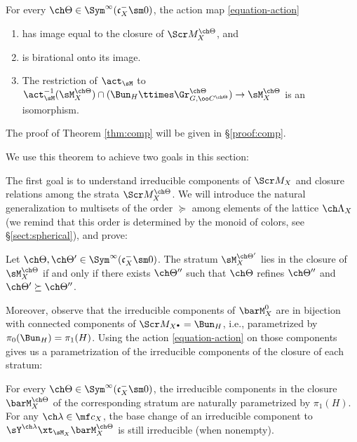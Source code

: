 \begin{thm}
\notready
\label{thm:comp}
For every $\ch\Theta \in \Sym^\infty(\mathfrak c_X^- \sm 0)$, the action map \eqref{equation-action}
\begin{enumerate}
\item has image equal to the closure of $\Scr M^{\ch\Theta}_X$, and
\item is birational onto its image.
\item The restriction of $\act_\sM$ to $\act_\sM^{-1}(\sM^{\ch\Theta}_X) \cap
(\Bun_H \ttimes \Gr^{\ch\Theta}_{G, \oo C^{\ch\Theta}}) \to \sM^{\ch\Theta}_X$
is an isomorphism.
\end{enumerate}
\end{thm}

The proof of Theorem \ref{thm:comp} will be given in \S \ref{proof:comp}.

We use this theorem to achieve two goals in this section:


The first goal is to understand irreducible components of $\Scr M_X$ and closure relations among the strata $\Scr M^{\ch\Theta}_X$.
We will introduce the natural generalization to multisets of the order $\succeq$ among elements of the lattice $\ch\Lambda_X$ (we remind that this order is determined by the monoid of colors, see \S \ref{sect:spherical}), and prove:
\begin{prop}
\notready
\label{proposition-closures}
Let $\ch\Theta,\ch\Theta' \in \Sym^\infty(\mathfrak c_X^-\sm 0)$.
The stratum $\sM^{\ch\Theta'}_X$ lies in the closure of $\sM^{\ch\Theta}_X$
if and only if there exists $\ch\Theta''$  such that $\ch\Theta$ refines $\ch\Theta''$ and $\ch\Theta' \succeq \ch\Theta''$.
\end{prop}

Moreover, observe that the irreducible components of $\barM_X^0$ are in bijection with connected components of $\Scr M_{X^\bullet} = \Bun_H$, i.e., parametrized by $\pi_0(\Bun_H) = \pi_1(H)$. Using the action \eqref{equation-action} on those components gives us a parametrization of the irreducible components of the closure of each stratum:
\begin{prop}
\notready
\label{proposition-irred-strata}
For every $\ch\Theta \in \Sym^\infty(\mathfrak c_X^-\sm 0)$, the irreducible components in the closure $\barM_X^{\ch\Theta}$ of the corresponding stratum are naturally parametrized by $\pi_1(H)$.
For any $\ch\lambda \in \mf c_X$, the base change of
an irreducible component to $\sY^{\ch\lambda} \xt_{\sM_X}
\barM_X^{\ch\Theta}$ is still irreducible (when nonempty).
\end{prop}

